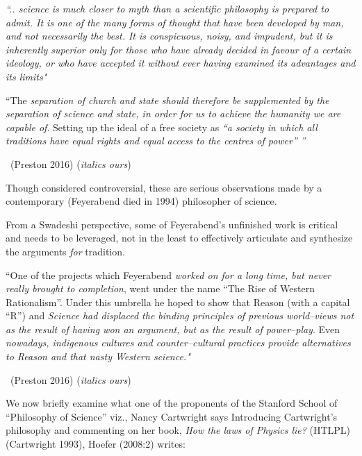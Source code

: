 \begin{myquote}
\textit{“.. science is much closer to myth than a scientific philosophy is prepared to admit. It is one of the many forms of thought that have been developed by man, and not necessarily the best. It is conspicuous, noisy, and impudent, but it is inherently superior only for those who have already decided in favour of a certain ideology, or who have accepted it without ever having examined its advantages and its limits"}
\end{myquote}

\begin{myquote}
“The \textit{separation of church and state should therefore be supplemented by the separation of science and state, in order for us to achieve the humanity we are capable of}. Setting up the ideal of a free society as \textit{“a society in which all traditions have equal rights and equal access to the centres of power” ”} 

~\hfill (Preston 2016) (\textit{italics ours})
\end{myquote}

Though considered controversial, these are serious observations made by a contemporary (Feyerabend died in 1994) philosopher of science.

From a Swadeshi perspective, some of Feyerabend’s unfinished work is critical and needs to be leveraged, not in the least to effectively articulate and synthesize the arguments \textit{for} tradition.

\begin{myquote}
“One of the projects which Feyerabend \textit{worked on for a long time, but never really brought to completion}, went under the name “The Rise of Western Rationalism”. Under this umbrella he hoped to show that Reason (with a capital “R”) and \textit{Science had displaced the binding principles of previous world–views not as the result of having won an argument, but as the result of power–play}. Even \textit{nowadays, indigenous cultures and counter–cultural practices provide alternatives to Reason and that nasty Western science."} 

~\hfill (Preston 2016) (\textit{italics ours})
\end{myquote}

We now briefly examine what one of the proponents of the Stanford School of “Philosophy of Science” viz., Nancy Cartwright says Introducing Cartwright’s philosophy and commenting on her book, \textit{How the laws of Physics lie?} (HTLPL) (Cartwright 1993), Hoefer (2008:2) writes:

